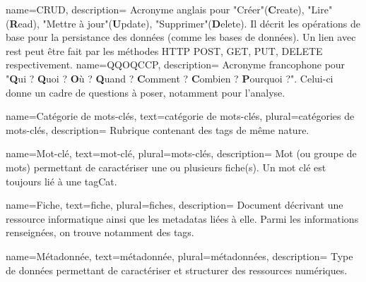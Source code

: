 {
    name={CRUD},
    description={
        Acronyme anglais pour "Créer"(\textbf{C}reate), "Lire" (\textbf{R}ead), "Mettre à jour"(\textbf{U}pdate), "Supprimer"(\textbf{D}elete). Il décrit les opérations de base pour la persistance des données (comme les bases de données). Un lien avec \Gls{rest} peut être fait par les méthodes HTTP POST, GET, PUT, DELETE respectivement.
    }
}
{
    name={QQOQCCP},
    description={
        Acronyme francophone pour "\textbf{Q}ui ? \textbf{Q}uoi ? \textbf{O}ù ? \textbf{Q}uand ? \textbf{C}omment ? \textbf{C}ombien ? \textbf{P}ourquoi ?". Celui-ci donne un cadre de questions à poser, notamment pour l'analyse.
    }
}

{
    name={Catégorie de mots-clés},
    text={catégorie de mots-clés},
    plural={catégories de mots-clés},
    description={
        Rubrique contenant des \glspl{tag} de même nature. 
    }
}

{
    name={Mot-clé},
    text={mot-clé},
    plural={mots-clés},
    description={
        Mot (ou groupe de mots) permettant de caractériser une ou plusieurs \gls{fiche}(s).
        Un mot clé est toujours lié à une \gls{tagCat}.
    }
}

{
    name={Fiche},
    text={fiche},
    plural={fiches},
    description={
        Document décrivant une ressource informatique ainsi que les \glspl{metadata} liées à elle. Parmi les informations renseignées, on trouve notamment des \glspl{tag}.
    }
}

{
    name={Métadonnée},
    text={métadonnée},
    plural={métadonnées},
    description={
        Type de données permettant de caractériser et structurer des ressources numériques.
    }
}